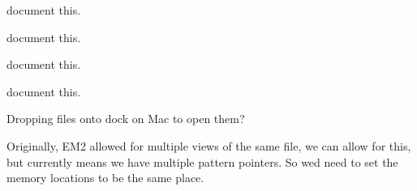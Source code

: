 \begin{DoxyRefList}
%
document this.  
\item[Member \mbox{\hyperlink{imgui__main_8c_ac4aeb4daa04ff262b2f2fd479dc0e98f}{Index\+Entry}} ]\label{todo__todo000003}%
%
document this.  
\item[Member \mbox{\hyperlink{imgui__main_8c_a100c6200e6b8744a8f92f6559f73b8b3}{infinite\+\_\+line\+\_\+action}} (void)]\label{todo__todo000144}%
%
document this.  
\item[Member \mbox{\hyperlink{imgui__main_8c_a5bc05721ad6272097545a51c437dc81e}{init\+\_\+command}} (void)]\label{todo__todo000181}%
%
document this.  
\item[Member \mbox{\hyperlink{imgui__main_8c_a5bf845222a9932ec353859701d62474b}{init\+\_\+view}} (void)]\label{todo__todo000083}%
%
Dropping files onto dock on Mac to open them?

\label{todo__todo000082}%
%
Originally, EM2 allowed for multiple views of the same file, we can allow for this, but currently means we have multiple pattern pointers. So we\textquotesingle{}d need to set the memory locations to be the same place.


\end{DoxyRefList}
